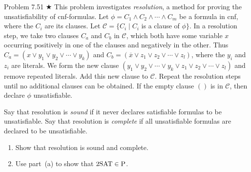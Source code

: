 \begin{question}{Problem 7.51 $\bigstar$}
This problem investigates \emph{resolution}, a method for proving the unsatisfiability of cnf-formulas. Let $\phi=C_1\land C_2\land\cdots\land C_m$ be a formula in cnf, where the $C_i$ are its clauses. Let $\mathcal{C}=\{C_i\mid C_i$ is a clause of $\phi\}$. In a resolution step, we take two clauses $C_a$ and $C_b$ in $\mathcal{C}$, which both have some variable $x$ occurring positively in one of the clauses and negatively in the other. Thus $C_a=(x\lor y_1\lor y_2\lor\cdots\lor y_k)$ and $C_b=(\overline{x}\lor z_1\lor z_2\lor\cdots\lor z_l)$, where the $y_i$ and $z_i$ are literals. We form the new clause $(y_1\lor y_2\lor\cdots\lor y_k\lor z_1\lor z_2\lor\cdots\lor z_l)$ and remove repeated literals. Add this new clause to $\mathcal{C}$. Repeat the resolution steps until no additional clauses can be obtained. If the empty clause $()$ is in $\mathcal{C}$, then declare $\phi$ unsatisfiable.

Say that resolution is \emph{sound} if it never declares satisfiable formulas to be unsatisfiable. Say that resolution is \emph{complete} if all unsatisfiable formulas are declared to be unsatisfiable.
\begin{enumerate}[label=\alph*.]
\item Show that resolution is sound and complete.
\item Use part~(a) to show that $\mathrm{2SAT}\in\mathrm{P}$.
\end{enumerate}
\end{question}
